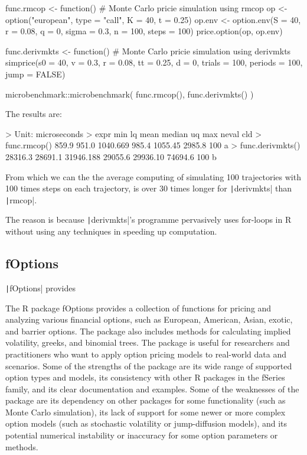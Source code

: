 \begin{Rminted}
func.rmcop <- function() { # Monte Carlo pricie simulation using rmcop
    op <- option("european", type = "call", K = 40, t = 0.25)
    op.env <- option.env(S = 40, r = 0.08, q = 0, sigma = 0.3, n = 100, steps = 100)
    price.option(op, op.env)
}

func.derivmkts <- function() { # Monte Carlo pricie simulation using derivmkts
    simprice(s0 = 40, v = 0.3, r = 0.08, tt = 0.25, d = 0,  trials = 100, periods = 100, jump = FALSE)
}

microbenchmark::microbenchmark(
    func.rmcop(),
    func.derivmkts()
)
\end{Rminted}

The results are:

\begin{Rminted}
> Unit: microseconds
>             expr     min      lq      mean  median       uq     max neval cld
>     func.rmcop()   859.9   951.0  1040.669   985.4  1055.45  2985.8   100  a 
> func.derivmkts() 28316.3 28691.1 31946.188 29055.6 29936.10 74694.6   100  b
\end{Rminted}

From which we can the the average computing of simulating 100 trajectories with 100 times steps on each trajectory, is over 30 times longer for \texttt|derivmkts| than \texttt|rmcop|.

The reason is because \texttt|derivmkts|'s programme pervasively uses for-loops in R without using any techniques in speeding up computation.


\subsection{fOptions} \label{sub:fOptions}

\texttt|fOptions| provides 

The R package fOptions provides a collection of functions for pricing and analyzing various financial options, such as European, American, Asian, exotic, and barrier options. The package also includes methods for calculating implied volatility, greeks, and binomial trees. The package is useful for researchers and practitioners who want to apply option pricing models to real-world data and scenarios. Some of the strengths of the package are its wide range of supported option types and models, its consistency with other R packages in the fSeries family, and its clear documentation and examples. Some of the weaknesses of the package are its dependency on other packages for some functionality (such as Monte Carlo simulation), its lack of support for some newer or more complex option models (such as stochastic volatility or jump-diffusion models), and its potential numerical instability or inaccuracy for some option parameters or methods.

